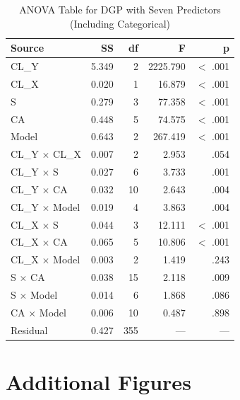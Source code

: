 \documentclass[12pt]{article}
\begin{document}
\begin{table}[h]
    \centering
    \caption{ANOVA Table for DGP with Seven Predictors (Including Categorical)}
    \label{tab:anova_v7}
    \vspace{0.2cm}
    \begin{tabular}{lrrrr}
        \toprule
        Source & SS & df & F & p \\
        \midrule
        CL\_Y           & 5.349  & 2   & 2225.790  & $<$ .001 \\
        CL\_X           & 0.020  & 1   & 16.879    & $<$ .001 \\
        S              & 0.279  & 3   & 77.358    & $<$ .001 \\
        CA             & 0.448  & 5   & 74.575    & $<$ .001 \\
        Model          & 0.643  & 2   & 267.419   & $<$ .001 \\
        CL\_Y $\times$ CL\_X  & 0.007  & 2   & 2.953    & .054  \\
        CL\_Y $\times$ S      & 0.027  & 6   & 3.733    & .001  \\
        CL\_Y $\times$ CA     & 0.032  & 10  & 2.643    & .004  \\
        CL\_Y $\times$ Model  & 0.019  & 4   & 3.863    & .004  \\
        CL\_X $\times$ S      & 0.044  & 3   & 12.111   & $<$ .001 \\
        CL\_X $\times$ CA     & 0.065  & 5   & 10.806   & $<$ .001 \\
        CL\_X $\times$ Model  & 0.003  & 2   & 1.419    & .243  \\
        S $\times$ CA         & 0.038  & 15  & 2.118    & .009  \\
        S $\times$ Model      & 0.014  & 6   & 1.868    & .086  \\
        CA $\times$ Model     & 0.006  & 10  & 0.487    & .898  \\
        Residual       & 0.427  & 355  & ---       & ---    \\
        \bottomrule
    \end{tabular}
\end{table}


\clearpage
\section{Additional Figures}
\label{app:figures}
\end{document}
